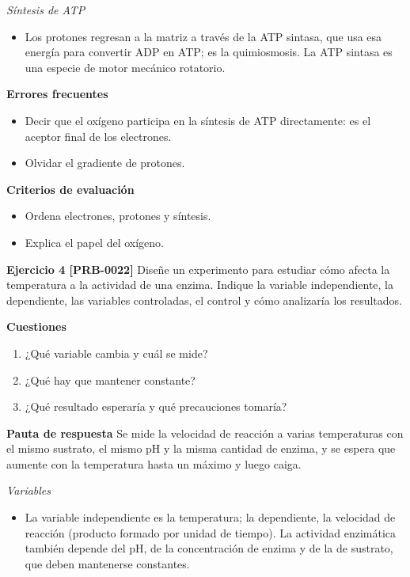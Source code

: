 \documentclass{book}
\begin{document}
\noindent\textit{Síntesis de ATP}
\begin{itemize}
\item Los protones regresan a la matriz a través de la ATP sintasa, que usa esa energía para convertir ADP en ATP; es la quimiosmosis. La ATP sintasa es una especie de motor mecánico rotatorio.
\end{itemize}

\noindent\textbf{Errores frecuentes}
\begin{itemize}
\item Decir que el oxígeno participa en la síntesis de ATP directamente: es el aceptor final de los electrones.
\item Olvidar el gradiente de protones.
\end{itemize}

\noindent\textbf{Criterios de evaluación}
\begin{itemize}
\item Ordena electrones, protones y síntesis.
\item Explica el papel del oxígeno.
\end{itemize}

\noindent\textbf{Ejercicio 4 [PRB-0022]}
Diseñe un experimento para estudiar cómo afecta la temperatura a la actividad de una enzima. Indique la variable independiente, la dependiente, las variables controladas, el control y cómo analizaría los resultados.


\noindent\textbf{Cuestiones}
\begin{enumerate}
\item ¿Qué variable cambia y cuál se mide?
\item ¿Qué hay que mantener constante?
\item ¿Qué resultado esperaría y qué precauciones tomaría?
\end{enumerate}

\noindent\textbf{Pauta de respuesta}
Se mide la velocidad de reacción a varias temperaturas con el mismo sustrato, el mismo pH y la misma cantidad de enzima, y se espera que aumente con la temperatura hasta un máximo y luego caiga.


\noindent\textit{Variables}
\begin{itemize}
\item La variable independiente es la temperatura; la dependiente, la velocidad de reacción (producto formado por unidad de tiempo). La actividad enzimática también depende del pH, de la concentración de enzima y de la de sustrato, que deben mantenerse constantes.
\end{itemize}
\end{document}
